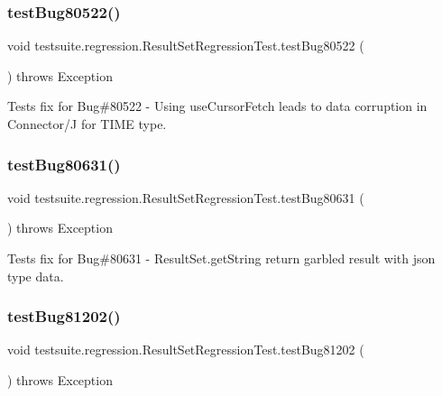 \subsubsection{\texorpdfstring{test\+Bug80522()}{testBug80522()}}
{\footnotesize\ttfamily void testsuite.\+regression.\+Result\+Set\+Regression\+Test.\+test\+Bug80522 (\begin{DoxyParamCaption}{ }\end{DoxyParamCaption}) throws Exception}

Tests fix for Bug\#80522 -\/ Using use\+Cursor\+Fetch leads to data corruption in Connector/J for T\+I\+ME type. \mbox{\label{classtestsuite_1_1regression_1_1_result_set_regression_test_a6e1a80555921fe0d80bc15731cb1d63d}} 
\subsubsection{\texorpdfstring{test\+Bug80631()}{testBug80631()}}
{\footnotesize\ttfamily void testsuite.\+regression.\+Result\+Set\+Regression\+Test.\+test\+Bug80631 (\begin{DoxyParamCaption}{ }\end{DoxyParamCaption}) throws Exception}

Tests fix for Bug\#80631 -\/ Result\+Set.\+get\+String return garbled result with json type data. \mbox{\label{classtestsuite_1_1regression_1_1_result_set_regression_test_aed8cd6b2bbcd1c46e0dc18214e1b59da}} 
\subsubsection{\texorpdfstring{test\+Bug81202()}{testBug81202()}}
{\footnotesize\ttfamily void testsuite.\+regression.\+Result\+Set\+Regression\+Test.\+test\+Bug81202 (\begin{DoxyParamCaption}{ }\end{DoxyParamCaption}) throws Exception}

